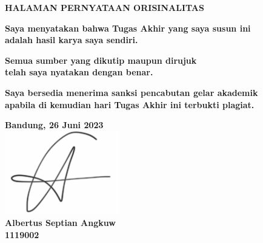 	\begin{center}
		\vspace*{0cm}
		
		{\large \bfseries HALAMAN PERNYATAAN ORISINALITAS \\}
		
		\vspace{4cm}
			
		\textbf{Saya menyatakan bahwa Tugas Akhir yang saya susun ini \\ adalah hasil karya saya sendiri.}
	
		\textbf{Semua sumber yang dikutip maupun dirujuk \\ telah saya nyatakan dengan benar.}
	
		\textbf{Saya bersedia menerima sanksi pencabutan gelar akademik \\ apabila di kemudian hari Tugas Akhir ini terbukti plagiat.}
			
	
		\vspace*{\fill} 
		\textbf{Bandung, 26 Juni 2023} \\
		\includegraphics[width=5cm]{img/sign.png}\\
		\textbf{Albertus Septian Angkuw} \\
		\textbf{1119002}
		\vspace{1cm}
		
	\end{center}